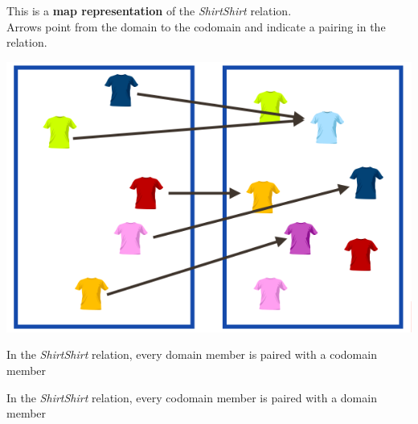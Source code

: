 \documentclass{ximera}
\author{Lee Wayand}
\begin{document}
\begin{exercise}

This is a \textbf{map representation} of the \textit{ShirtShirt} relation. \\


Arrows point from the domain to the codomain and indicate a pairing in the relation.


\begin{image}
\includegraphics{../../pics/func_maps/f_7.png}
\end{image}




\begin{question} 
In the \textit{ShirtShirt} relation, every domain member is paired with a codomain member

\begin{multipleChoice}
\end{multipleChoice}
\end{question}







\begin{question} 
In the \textit{ShirtShirt} relation, every codomain member is paired with a domain member

\begin{multipleChoice}
\end{multipleChoice}
\end{question}








\end{exercise}
\end{document}
